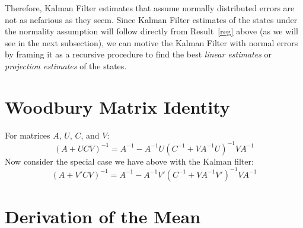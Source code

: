 \documentclass[a4paper,12pt]{article}
\begin{document}
Therefore, Kalman Filter estimates that assume normally distributed
errors are not as nefarious as they seem. Since Kalman Filter estimates
of the states under the normality assumption will follow directly from
Result~\ref{reg} above (as we will see in the next subsection), we can
motive the Kalman Filter with normal errors by framing it as a recursive
procedure to find the best \emph{linear estimates} or \emph{projection
estimates} of the states.



\section{Woodbury Matrix Identity}

For matrices $A$, $U$, $C$, and $V$:
\begin{equation}
    (A+UCV)^{-1} = A^{-1} - A^{-1} U(C^{-1} + VA^{-1}U)^{-1}
	VA^{-1}
\end{equation}
Now consider the special case we have above with the
Kalman filter:
\begin{equation}
    \label{special}
    (A + V'CV)^{-1} = A^{-1} - A^{-1} V'(C^{-1} + VA^{-1}V')^{-1}
	VA^{-1}
\end{equation}

\section{Derivation of the Mean}
\end{document}
